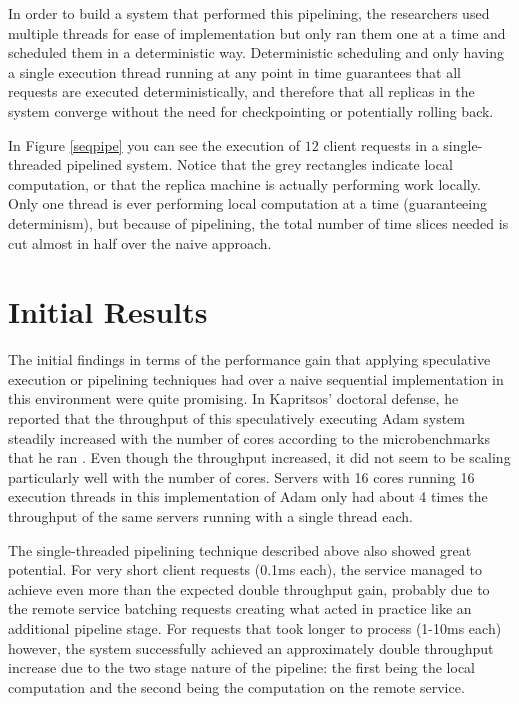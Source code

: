\documentclass[11pt, oneside]{report}
\begin{document}
In order to build a system that performed this pipelining, the researchers used multiple threads for ease of implementation but only ran them one at a time and scheduled them in a deterministic way. 
Deterministic scheduling and only having a single execution thread running at any point in time guarantees that all requests are executed deterministically, and therefore that all replicas in the system converge without the need for checkpointing or potentially rolling back.

In Figure \ref{seqpipe} you can see the execution of $12$ client requests in a single-threaded pipelined system. Notice that the grey rectangles indicate local computation, or that the replica machine is actually performing work locally. Only one thread is ever performing local computation at a time (guaranteeing determinism), but because of pipelining, the total number of time slices needed is cut almost in half over the naive approach.

\section{Initial Results}

The initial findings in terms of the performance gain that applying speculative execution or pipelining techniques had over a naive sequential implementation in this environment were quite promising. 
In Kapritsos' doctoral defense, he reported that the throughput of this speculatively executing Adam system steadily increased with the number of cores according to the microbenchmarks that he ran \cite{manosThesis}. 
Even though the throughput increased, it did not seem to be scaling particularly well with the number of cores. 
Servers with 16 cores running 16 execution threads in this implementation of Adam only had about 4 times the throughput of the same servers running with a single thread each.

The single-threaded pipelining technique described above also showed great potential. 
For very short client requests (0.1ms each), the service managed to achieve even more than the expected double throughput gain, probably due to the remote service batching requests creating what acted in practice like an additional pipeline stage. 
For requests that took longer to process (1-10ms each) however, the system successfully achieved an approximately double throughput increase due to the two stage nature of the pipeline: the first being the local computation and the second being the computation on the remote service.
\end{document}
